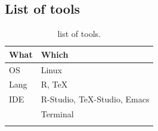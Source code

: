\documentclass[a4paper,12pt,titlepage]{article} %
\begin{document}
\subsection{List of tools}
\begin{table}[h]
	\begin{tabularx}{\textwidth}{|l|X|}
		\hline
		What & Which \\
		\hline
		OS & Linux \\
		\hline
		Lang & R, \TeX \\
		\hline
		IDE & R-Studio, \TeX-Studio, Emacs\\
		\hline
		& Terminal\\
		\hline
		& \\
		\hline
	\end{tabularx}
	\caption{list of tools.}
\end{table}

\end{document}

